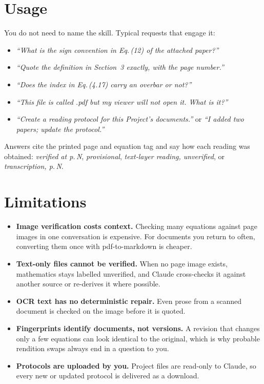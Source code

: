 \documentclass[11pt,a4paper]{article}
\begin{document}
\section{Usage}

You do not need to name the skill. Typical requests that engage it:
\begin{itemize}
\item \emph{``What is the sign convention in Eq.\,(12) of the attached paper?''}
\item \emph{``Quote the definition in Section~3 exactly, with the page number.''}
\item \emph{``Does the index in Eq.\,(4.17) carry an overbar or not?''}
\item \emph{``This file is called .pdf but my viewer will not open it. What is it?''}
\item \emph{``Create a reading protocol for this Project's documents.''}
  or \emph{``I added two papers; update the protocol.''}
\end{itemize}

\noindent Answers cite the printed page and equation tag and say how each reading was
obtained: \emph{verified at p.\,N}, \emph{provisional}, \emph{text-layer reading, unverified},
or \emph{transcription, p.\,N}.

\section{Limitations}
\begin{itemize}
\item \textbf{Image verification costs context.} Checking many equations against page images
  in one conversation is expensive. For documents you return to often, converting them once
  with pdf-to-markdown is cheaper.
\item \textbf{Text-only files cannot be verified.} When no page image exists, mathematics
  stays labelled unverified, and Claude cross-checks it against another source or re-derives
  it where possible.
\item \textbf{OCR text has no deterministic repair.} Even prose from a scanned document is
  checked on the image before it is quoted.
\item \textbf{Fingerprints identify documents, not versions.} A revision that changes only a
  few equations can look identical to the original, which is why probable rendition swaps
  always end in a question to you.
\item \textbf{Protocols are uploaded by you.} Project files are read-only to Claude, so every
  new or updated protocol is delivered as a download.
\end{itemize}
\end{document}
